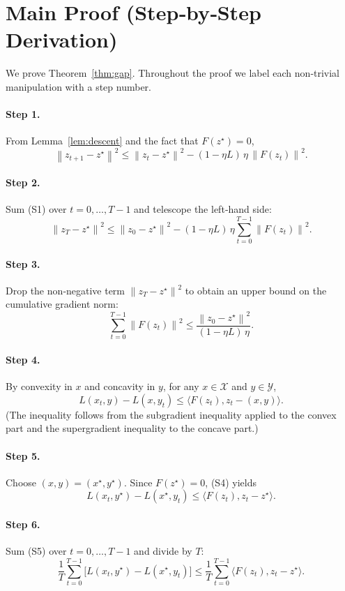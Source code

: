 \documentclass{article}
\newcommand{\F}{F}
\newcommand{\z}{z}
\newcommand{\zz}{z^{\star}}
\newcommand{\norm}[1]{\left\|#1\right\|}
\begin{document}
\section*{Main Proof (Step‑by‑Step Derivation)}
We prove Theorem~\ref{thm:gap}. Throughout the proof we label each non‑trivial manipulation with a step number.

\paragraph{Step 1.}  From Lemma~\ref{lem:descent} and the fact that $\F(\zz)=0$,
\[
\norm{\z_{t+1}-\zz}^{2}
\le \norm{\z_{t}-\zz}^{2}
- (1-\eta L)\,\eta\,\norm{\F(\z_{t})}^{2}.
\tag{S1}
\]

\paragraph{Step 2.}  Sum (S1) over $t=0,\dots,T-1$ and telescope the left‑hand side:
\[
\norm{\z_{T}-\zz}^{2}
\le \norm{\z_{0}-\zz}^{2}
- (1-\eta L)\,\eta\sum_{t=0}^{T-1}\norm{\F(\z_{t})}^{2}.
\tag{S2}
\]

\paragraph{Step 3.}  Drop the non‑negative term $\norm{\z_{T}-\zz}^{2}$ to obtain an upper bound on the cumulative gradient norm:
\[
\sum_{t=0}^{T-1}\norm{\F(\z_{t})}^{2}
\le \frac{\norm{\z_{0}-\zz}^{2}}{(1-\eta L)\,\eta}.
\tag{S3}
\]

\paragraph{Step 4.}  By convexity in $x$ and concavity in $y$, for any $x\in\mathcal{X}$ and $y\in\mathcal{Y}$,
\[
L(x_{t},y)-L(x,y_{t})
\le \langle \F(\z_{t}),\z_{t}-(x,y)\rangle .
\tag{S4}
\]
(The inequality follows from the subgradient inequality applied to the convex part and the supergradient inequality to the concave part.)

\paragraph{Step 5.}  Choose $(x,y)=(x^{\star},y^{\star})$. Since $\F(\zz)=0$, (S4) yields
\[
L(x_{t},y^{\star})-L(x^{\star},y_{t})
\le \langle \F(\z_{t}),\z_{t}-\zz\rangle .
\tag{S5}
\]

\paragraph{Step 6.}  Sum (S5) over $t=0,\dots,T-1$ and divide by $T$:
\[
\frac{1}{T}\sum_{t=0}^{T-1}\bigl[L(x_{t},y^{\star})-L(x^{\star},y_{t})\bigr]
\le \frac{1}{T}\sum_{t=0}^{T-1}\langle \F(\z_{t}),\z_{t}-\zz\rangle .
\tag{S6}
\]
\end{document}
